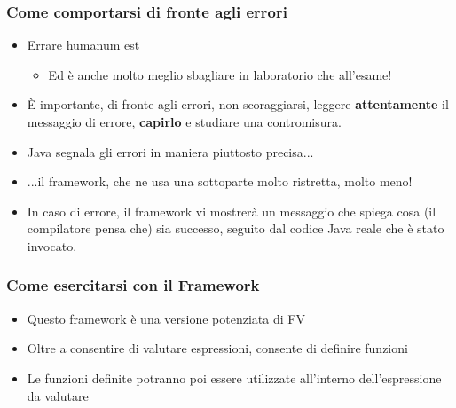 \documentclass{beamer}
\begin{document}
\begin{frame}
\frametitle{Come comportarsi di fronte agli errori}
\begin{itemize}
 \item Errare humanum est
  \begin{itemize}
    \item Ed è anche molto meglio sbagliare in laboratorio che all'esame!
  \end{itemize}
 \item È importante, di fronte agli errori, non scoraggiarsi, leggere \textbf{attentamente} il messaggio di errore, \textbf{capirlo} e studiare una contromisura.
 \item Java segnala gli errori in maniera piuttosto precisa...
 \item ...il framework, che ne usa una sottoparte molto ristretta, molto meno!
 \item In caso di errore, il framework vi mostrerà un messaggio che spiega cosa (il compilatore pensa che) sia successo, seguito dal codice Java reale che è stato invocato.
\end{itemize}
\end{frame}

\begin{frame}
\frametitle{Come esercitarsi con il Framework}
\begin{itemize}
 \item Questo framework è una versione potenziata di FV
 \item Oltre a consentire di valutare espressioni, consente di definire funzioni
 \item Le funzioni definite potranno poi essere utilizzate all'interno dell'espressione da valutare
\end{itemize}
\end{frame}
\end{document}

